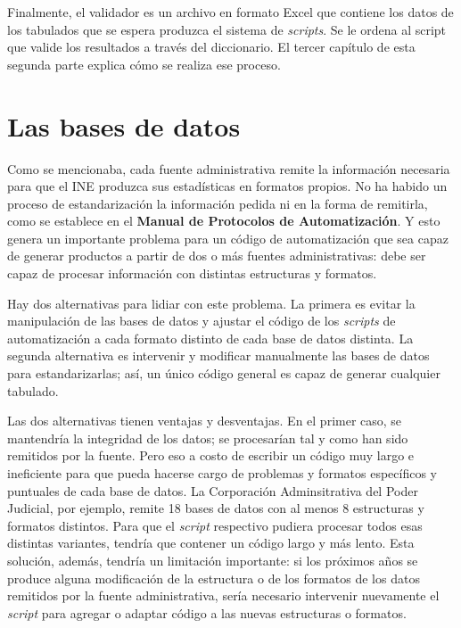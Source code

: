 \documentclass[
  spanish,
]{book}
\begin{document}
Finalmente, el validador es un archivo en formato Excel que contiene los datos de los tabulados que se espera produzca el sistema de \emph{scripts}. Se le ordena al script que valide los resultados a través del diccionario. El tercer capítulo de esta segunda parte explica cómo se realiza ese proceso.

\hypertarget{las-bases-de-datos}{%
\chapter{Las bases de datos}\label{las-bases-de-datos}}

Como se mencionaba, cada fuente administrativa remite la información necesaria para que el INE produzca sus estadísticas en formatos propios. No ha habido un proceso de estandarización la información pedida ni en la forma de remitirla, como se establece en el \textbf{Manual de Protocolos de Automatización}. Y esto genera un importante problema para un código de automatización que sea capaz de generar productos a partir de dos o más fuentes administrativas: debe ser capaz de procesar información con distintas estructuras y formatos.

Hay dos alternativas para lidiar con este problema. La primera es evitar la manipulación de las bases de datos y ajustar el código de los \emph{scripts} de automatización a cada formato distinto de cada base de datos distinta. La segunda alternativa es intervenir y modificar manualmente las bases de datos para estandarizarlas; así, un único código general es capaz de generar cualquier tabulado.

Las dos alternativas tienen ventajas y desventajas. En el primer caso, se mantendría la integridad de los datos; se procesarían tal y como han sido remitidos por la fuente. Pero eso a costo de escribir un código muy largo e ineficiente para que pueda hacerse cargo de problemas y formatos específicos y puntuales de cada base de datos. La Corporación Adminsitrativa del Poder Judicial, por ejemplo, remite 18 bases de datos con al menos 8 estructuras y formatos distintos. Para que el \emph{script} respectivo pudiera procesar todos esas distintas variantes, tendría que contener un código largo y más lento. Esta solución, además, tendría un limitación importante: si los próximos años se produce alguna modificación de la estructura o de los formatos de los datos remitidos por la fuente administrativa, sería necesario intervenir nuevamente el \emph{script} para agregar o adaptar código a las nuevas estructuras o formatos.
\end{document}

